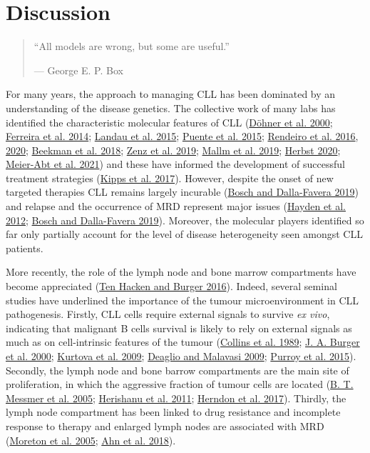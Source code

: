 \documentclass[11pt, a4paper, twosided]{book}
\begin{document}
\hypertarget{discussion}{%
\chapter{Discussion}\label{discussion}}
\begin{quote}
``All models are wrong, but some are useful.''

\hfill --- George E. P. Box
\end{quote}
For many years, the approach to managing CLL has been dominated by an understanding of the disease genetics. The collective work of many labs has identified the characteristic molecular features of CLL (\protect\hyperlink{ref-Dohner2000}{Döhner et al. 2000}; \protect\hyperlink{ref-Ferreira2014}{Ferreira et al. 2014}; \protect\hyperlink{ref-Landau2015}{Landau et al. 2015}; \protect\hyperlink{ref-Puente2015}{Puente et al. 2015}; \protect\hyperlink{ref-Rendeiro2016}{Rendeiro et al. 2016}, \protect\hyperlink{ref-Rendeiro2020}{2020}; \protect\hyperlink{ref-Beekman2018}{Beekman et al. 2018}; \protect\hyperlink{ref-Zenz2019}{Zenz et al. 2019}; \protect\hyperlink{ref-Mallm2019}{Mallm et al. 2019}; \protect\hyperlink{ref-HerbstThesis}{Herbst 2020}; \protect\hyperlink{ref-MeierAbt2021}{Meier-Abt et al. 2021}) and these have informed the development of successful treatment strategies (\protect\hyperlink{ref-Kipps2017}{Kipps et al. 2017}). However, despite the onset of new targeted therapies CLL remains largely incurable (\protect\hyperlink{ref-Bosch2019}{Bosch and Dalla-Favera 2019}) and relapse and the occurrence of MRD represent major issues (\protect\hyperlink{ref-Hayden2012}{Hayden et al. 2012}; \protect\hyperlink{ref-Bosch2019}{Bosch and Dalla-Favera 2019}). Moreover, the molecular players identified so far only partially account for the level of disease heterogeneity seen amongst CLL patients.

More recently, the role of the lymph node and bone marrow compartments have become appreciated (\protect\hyperlink{ref-tenHacken2016}{Ten Hacken and Burger 2016}). Indeed, several seminal studies have underlined the importance of the tumour microenvironment in CLL pathogenesis. Firstly, CLL cells require external signals to survive \emph{ex vivo}, indicating that malignant B cells survival is likely to rely on external signals as much as on cell-intrinsic features of the tumour (\protect\hyperlink{ref-Collins1989}{Collins et al. 1989}; \protect\hyperlink{ref-Burger2000}{J. A. Burger et al. 2000}; \protect\hyperlink{ref-Kurtova2009}{Kurtova et al. 2009}; \protect\hyperlink{ref-Deaglio2009}{Deaglio and Malavasi 2009}; \protect\hyperlink{ref-Purroy2015}{Purroy et al. 2015}). Secondly, the lymph node and bone barrow compartments are the main site of proliferation, in which the aggressive fraction of tumour cells are located (\protect\hyperlink{ref-Messmer2005}{B. T. Messmer et al. 2005}; \protect\hyperlink{ref-Herishanu2011}{Herishanu et al. 2011}; \protect\hyperlink{ref-Herndon2017}{Herndon et al. 2017}). Thirdly, the lymph node compartment has been linked to drug resistance and incomplete response to therapy and enlarged lymph nodes are associated with MRD (\protect\hyperlink{ref-Moreton2005}{Moreton et al. 2005}; \protect\hyperlink{ref-Ahn2018}{Ahn et al. 2018}).
\end{document}
